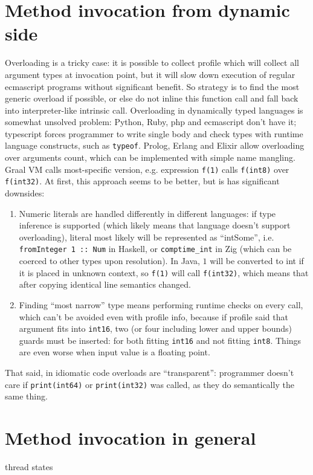 \documentclass[times, %
			   specification,annotation, %
			   titlepage-extra-ru,specification-extra-ru,annotation-extra-ru, %
			   languages={russian,english} %
			  ]{itmo-student-thesis}
\begin{document}
\section{Method invocation from dynamic side}
Overloading is a tricky case: it is possible to collect profile which will collect all argument types at invocation point, but it will slow down execution of regular ecmascript programs without significant benefit. So strategy is to find the most generic overload if possible, or else do not inline this function call and fall back into interpreter-like intrinsic call. Overloading in dynamically typed languages is somewhat unsolved problem: Python, Ruby, php and ecmascript don't have it; typescript forces programmer to write single body and check types with runtime language constructs, such as \texttt{typeof}. Prolog, Erlang and Elixir allow overloading over arguments count, which can be implemented with simple name mangling.\\
Graal VM calls most-specific version, e.g. expression \texttt{f(1)} calls \texttt{f(int8)} over \texttt{f(int32)}. At first, this approach seems to be better, but is has significant downsides:\\
\begin{enumerate}
	\item Numeric literals are handled differently in different languages: if type inference is supported (which likely means that language doesn't support overloading), literal most likely will be represented as ``intSome'', i.e. \texttt{fromInteger 1 :: Num} in Haskell, or \texttt{comptime\_int} in Zig (which can be coerced to other types upon resolution). In Java, $1$ will be converted to int if it is placed in unknown context, so \texttt{f(1)} will call \texttt{f(int32)}, which means that after copying identical line semantics changed.
	\item Finding ``most narrow'' type means performing runtime checks on every call, which can't be avoided even with profile info, because if profile said that argument fits into \texttt{int16}, two (or four including lower and upper bounds) guards must be inserted: for both fitting \texttt{int16} and not fitting \texttt{int8}. Things are even worse when input value is a floating point.
\end{enumerate}
That said, in idiomatic code overloads are ``transparent'': programmer doesn't care if \texttt{print(int64)} or \texttt{print(int32)} was called, as they do semantically the same thing.

\section{Method invocation in general}
\TODO thread states
\end{document}
